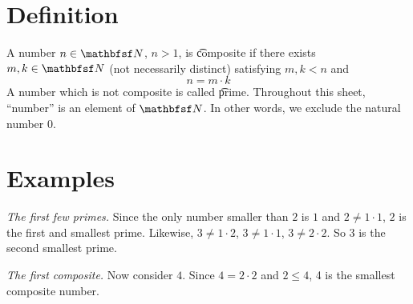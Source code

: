 
\section*{Definition}

A number $n \in \N  $, $n > 1$, is \t{composite} if there exists $m, k \in \N  $ (not necessarily distinct) satisfying $m, k < n$ and
\[
n = m\cdot k
\]
A number which is not composite is called \t{prime}.
Throughout this sheet, ``number'' is an element of $\N  $.
In other words, we exclude the natural number 0.

\section*{Examples}

\textit{The first few primes.}
Since the only number smaller than $2$ is $1$ and $2 \neq 1\cdot 1$, $2$ is the first and smallest prime.
Likewise, $3 \neq 1\cdot 2$, $3 \neq 1\cdot 1$, $3 \neq 2\cdot 2$.
So $3$ is the second smallest prime.

\textit{The first composite.}
Now consider $4$.
Since $4 = 2\cdot 2$ and $2 \leq 4$, 4 is the smallest composite number.

\blankpage